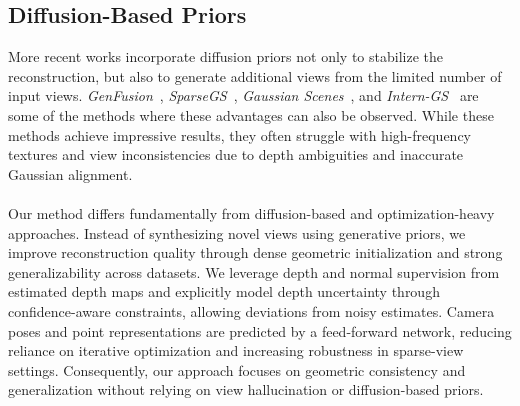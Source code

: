 \subsection{Diffusion-Based Priors}
More recent works incorporate diffusion priors not only to stabilize the reconstruction,
but also to generate additional views from the limited number of input views.
\textit{GenFusion}~\cite{GenFusion}, \textit{SparseGS}~\cite{SparseGS},
\textit{Gaussian Scenes}~\cite{GaussianScenes}, and \textit{Intern-GS}~\cite{InternGS}
are some of the methods where these advantages can also be observed.
While these methods achieve impressive results, they often struggle with high-frequency textures
and view inconsistencies due to depth ambiguities and inaccurate Gaussian alignment.
\\\\
Our method differs fundamentally from diffusion-based and optimization-heavy approaches.
Instead of synthesizing novel views using generative priors, we improve reconstruction
quality through dense geometric initialization and strong generalizability across datasets.
We leverage depth and normal supervision from estimated depth maps and explicitly model depth
uncertainty through confidence-aware constraints, allowing deviations from noisy estimates. Camera poses
and point representations are predicted by a feed-forward network, reducing reliance on iterative optimization
and increasing robustness in sparse-view settings. Consequently, our approach focuses on geometric consistency and
generalization without relying on view hallucination or diffusion-based priors.